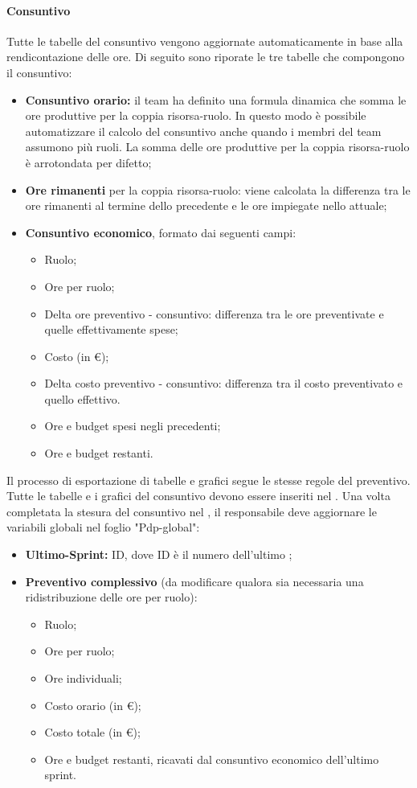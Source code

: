 \paragraph*{Consuntivo}
Tutte le tabelle del consuntivo vengono aggiornate automaticamente in base alla rendicontazione delle ore. Di seguito sono riporate le tre tabelle che compongono il consuntivo:
\begin{itemize}
  \item \textbf{Consuntivo orario:} il team ha definito una formula dinamica che somma le ore produttive per la coppia risorsa-ruolo. In questo modo è possibile automatizzare il calcolo del consuntivo anche quando i membri del team assumono più ruoli. La somma delle ore produttive per la coppia risorsa-ruolo è arrotondata per difetto;
  \item \textbf{Ore rimanenti} per la coppia risorsa-ruolo: viene calcolata la differenza tra le ore rimanenti al termine dello  precedente e le ore impiegate nello  attuale;
  \item \textbf{Consuntivo economico}, formato dai seguenti campi:
  \begin{itemize}
    \item Ruolo;
    \item Ore per ruolo;
    \item Delta ore preventivo - consuntivo: differenza tra le ore preventivate e quelle effettivamente spese;
    \item Costo (in €);
    \item Delta costo preventivo - consuntivo: differenza tra il costo preventivato e quello effettivo.
    \item Ore e budget spesi negli  precedenti;
    \item Ore e budget restanti.
  \end{itemize}
\end{itemize}
\par Il processo di esportazione di tabelle e grafici segue le stesse regole del preventivo. Tutte le tabelle e i grafici del consuntivo devono essere inseriti nel \PdP. Una volta completata la stesura del consuntivo nel \PdP, il responsabile deve aggiornare le variabili globali nel foglio "Pdp-global":
\begin{itemize}
  \item \textbf{Ultimo-Sprint:} ID, dove ID è il numero dell'ultimo ;
  \item \textbf{Preventivo complessivo} (da modificare qualora sia necessaria una ridistribuzione delle ore per ruolo):
  \begin{itemize}
    \item Ruolo;
    \item Ore per ruolo;
    \item Ore individuali;
    \item Costo orario (in €);
    \item Costo totale (in €);
    \item Ore e budget restanti, ricavati dal consuntivo economico dell'ultimo sprint.
  \end{itemize}
\end{itemize}
